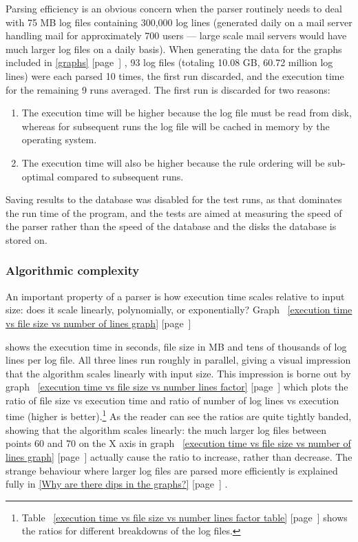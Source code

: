 \documentclass[a4paper,12pt,draft]{article}
\newcommand{\refwithpage}[1]{%
    \empty{}\ref{#1} [page~\pageref{#1}]%
}
\newcommand{\sectionref}[1]{%
    \textsection{}\refwithpage{#1}%
}
\newcommand{\numberOFlogFILES}[0]{%
    93%
}
\newcommand{\numberOFlogLINEShuman}[0]{%
    60.72 million%
}
\begin{document}
\label{rule efficiency}

Parsing efficiency is an obvious concern when the parser routinely needs to
deal with 75 MB log files containing 300,000 log lines (generated daily on
a mail server handling mail for approximately 700 users --- large scale
mail servers would have much larger log files on a daily basis).  When
generating the data for the graphs included in \sectionref{graphs},
\numberOFlogFILES{} log files (totaling 10.08 GB, \numberOFlogLINEShuman{}
log lines) were each parsed 10 times, the first run discarded, and the
execution time for the remaining 9 runs averaged.  The first run is
discarded for two reasons:

\begin{enumerate}

    \item The execution time will be higher because the log file must be
        read from disk, whereas for subsequent runs the log file will be
        cached in memory by the operating system.

    \item The execution time will also be higher because the rule ordering
        will be sub-optimal compared to subsequent runs.

\end{enumerate}

Saving results to the database was disabled for the test runs, as that
dominates the run time of the program, and the tests are aimed at measuring
the speed of the parser rather than the speed of the database and the disks
the database is stored on.

\subsubsection{Algorithmic complexity}

An important property of a parser is how execution time scales relative to
input size: does it scale linearly, polynomially, or exponentially?
Graph~\refwithpage{execution time vs file size vs number of lines graph}
shows the execution time in seconds, file size in MB and tens of thousands
of log lines per log file.  All three lines run roughly in parallel, giving
a visual impression that the algorithm scales linearly with input size.
This impression is borne out by graph~\refwithpage{execution time vs file
size vs number lines factor} which plots the ratio of file size vs
execution time and ratio of number of log lines vs execution time (higher
is better).\footnote{Table~\refwithpage{execution time vs file size vs
number lines factor table} shows the ratios for different breakdowns of the
log files.}  As the reader can see the ratios are quite tightly banded,
showing that the algorithm scales linearly: the much larger log files
between points 60 and 70 on the X axis in graph~\refwithpage{execution time
vs file size vs number of lines graph} actually cause the ratio to
increase, rather than decrease.  The strange behaviour where larger log
files are parsed more efficiently is explained fully in \sectionref{Why are
there dips in the graphs?}.  
\end{document}
